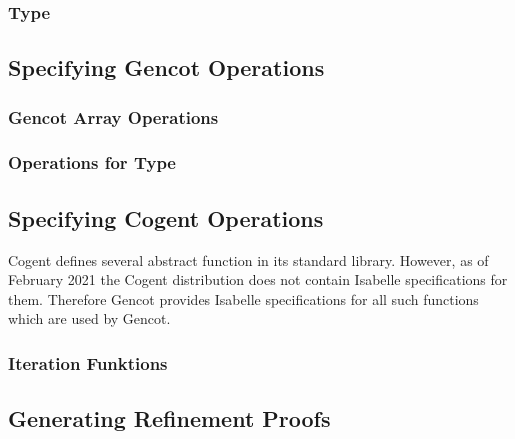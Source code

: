 \subsubsection{Type }

\subsection{Specifying Gencot Operations}
\label{design-isabelle-operations}

\subsubsection{Gencot Array Operations}

\subsubsection{Operations for Type }

\subsection{Specifying Cogent Operations}
\label{design-isabelle-cogentops}

Cogent defines several abstract function in its standard library. However, as of February 2021 the Cogent distribution
does not contain Isabelle specifications for them. Therefore Gencot provides Isabelle specifications for all such
functions which are used by Gencot.

\subsubsection{Iteration Funktions}

\subsection{Generating Refinement Proofs}
\label{design-isabelle-proofs}

